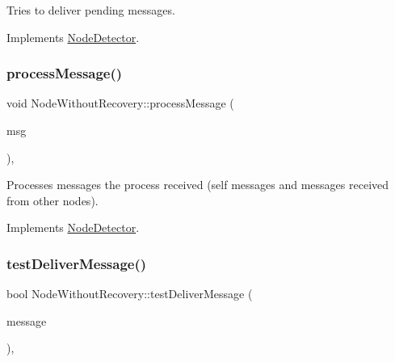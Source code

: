 Tries to deliver pending messages. 



Implements \hyperlink{class_node_detector_a17ecf9939fce7471f4513b66185743cc}{Node\+Detector}.

\mbox{\label{class_node_without_recovery_a0b44132b4ebc650399711766cb050399}} 
\subsubsection{\texorpdfstring{process\+Message()}{processMessage()}}
{\footnotesize\ttfamily void Node\+Without\+Recovery\+::process\+Message (\begin{DoxyParamCaption}\item[{c\+Message $\ast$}]{msg }\end{DoxyParamCaption})\hspace{0.3cm}{\ttfamily [protected]}, {\ttfamily [virtual]}}



Processes messages the process received (self messages and messages received from other nodes). 



Implements \hyperlink{class_node_detector_ab69432c6d3327a684845ec231826727e}{Node\+Detector}.

\mbox{\label{class_node_without_recovery_a8cf83ec6d0af26e385dcde0bc03f5b6d}} 
\subsubsection{\texorpdfstring{test\+Deliver\+Message()}{testDeliverMessage()}}
{\footnotesize\ttfamily bool Node\+Without\+Recovery\+::test\+Deliver\+Message (\begin{DoxyParamCaption}\item[{const \hyperlink{structures_8h_a7e7bdc1d2fff8a9436f2f352b2711ed6}{message\+Info} \&}]{message }\end{DoxyParamCaption})\hspace{0.3cm}{\ttfamily [protected]}, {\ttfamily [virtual]}}



